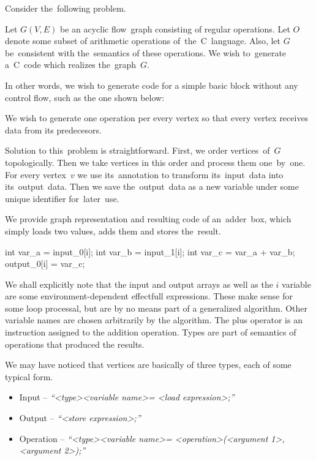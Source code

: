 Consider the~following problem.

\begin{problem}
Let $G(V,E)$ be an acyclic flow~graph consisting of regular operations. Let $O$ denote some subset of arithmetic operations of~the~C~language. Also, let $G$ be~consistent with the~semantics of these operations. We wish to~generate a~C~code which realizes the~graph~$G$.
\end{problem}

In other words, we wish to generate code for a simple basic block without any control flow, such as the one shown below:


We wish to generate one operation per every vertex so that every vertex receives data from its predecesors.

Solution to this~problem is straightforward. First, we order vertices~of~$G$ topologically. Then we take vertices in this order and process them one~by~one. For every vertex~$v$ we use its~annotation to transform its~input~data into its~output~data. Then we save the~output~data as a new variable under some unique identifier for~later~use.


We provide graph representation and resulting code of an~adder~box, which simply loads two values, adds them and stores the~result.

\begin{code}
int var_a = input_0[i];
int var_b = input_1[i];
int var_c = var_a + var_b;
output_0[i] = var_c;
\end{code}

\begin{rem}
  We shall explicitly note that the input and output arrays as well as the $i$ variable are some environment-dependent effectfull expressions. These make sense for some loop processal, but are by no means part of a generalized algorithm. Other variable names are chosen arbitrarily by the algorithm. The plus operator is an instruction assigned to the addition operation. Types are part of semantics of operations that produced the results.
\end{rem}

We may have noticed that vertices are basically of three types, each of some typical form. 

\begin{itemize}
  \item Input -- \emph{``\textless type\textgreater  \textless variable name\textgreater  = \textless load expression\textgreater ;''}
  \item Output -- \emph{``\textless store expression\textgreater ;''}
  \item Operation -- \emph{``\textless type\textgreater  \textless variable name\textgreater  = \textless operation\textgreater (\textless argument 1\textgreater , \textless argument 2\textgreater );''}
\end{itemize}

